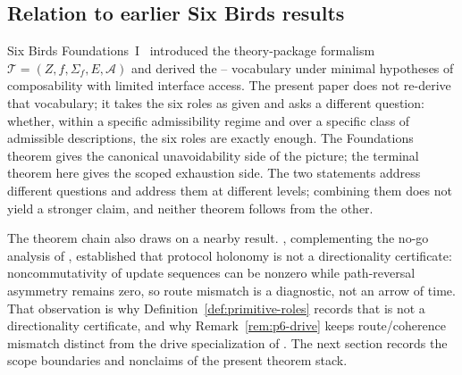 \subsection{Relation to earlier Six Birds results}\label{subsec:discussion-earlier-results}

Six Birds Foundations~I~\citep{Tsiokos2026SixBirdsFoundations}
introduced the theory-package formalism
\(\mathcal{T} = (Z, f, \Sigma_f, E, \mathcal{A})\) and derived the
\Pone{}--\Psix{} vocabulary under minimal hypotheses of composability
with limited interface access. The present paper does not re-derive
that vocabulary; it takes the six roles as given and asks a
different question: whether, within a specific admissibility regime
and over a specific class of admissible descriptions, the six roles
are exactly enough. The Foundations theorem gives the canonical
unavoidability side of the picture; the terminal theorem here gives
the scoped exhaustion side. The two statements address different
questions and address them at different levels; combining them does
not yield a stronger claim, and neither theorem follows from the
other.

The theorem chain also draws on a nearby
result. \citet{Tsiokos2026SixBirdsProtocolTrap}, complementing the
no-go analysis of \citet{Tsiokos2026SixBirdsNoGo}, established that
protocol holonomy is not a directionality certificate:
noncommutativity of update sequences can be nonzero while
path-reversal asymmetry remains zero, so route mismatch is a
diagnostic, not an arrow of time. That observation is why
Definition~\ref{def:primitive-roles} records that \Pthree{} is not a
directionality certificate, and why Remark~\ref{rem:p6-drive} keeps \Pthree{}
route/coherence mismatch distinct from the drive specialization of
\Psix{}. The next section records the
scope boundaries and nonclaims of the present theorem stack.
